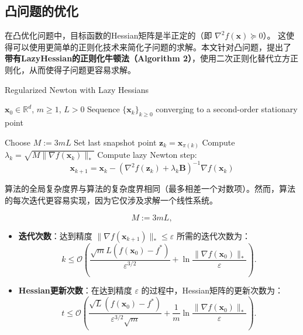 \documentclass[a4paper,twoside,AutoFakeBold]{article}
\theoremstyle{definition}
\begin{document}
\newpage

\subsection{凸问题的优化}\label{sec:4}
在凸优化问题中，目标函数的Hessian矩阵是半正定的（即 \(\nabla^{2}f(\mathbf{x}) \succeq 0\)）。
这使得可以使用更简单的正则化技术来简化子问题的求解。本文针对凸问题，提出了
\textbf{带有LazyHessian的正则化牛顿法（Algorithm 2）}，使用二次正则化替代立方正则化，从而使得子问题更容易求解。

\begin{algorithm}
\caption{Regularized Newton with Lazy Hessians}\label{alg:2}
\begin{algorithmic}[2]
\REQUIRE $\mathbf{x}_{0} \in \mathbb{R}^{d}$, $m \geq 1$, $L > 0$
\ENSURE Sequence $\{\mathbf{x}_{k}\}_{k \geq 0}$ converging to a second-order stationary point

\STATE Choose $M := 3mL$ 
	\STATE Set last snapshot point $\mathbf{z}_{k} = \mathbf{x}_{\pi(k)}$ 
	\STATE Compute $\lambda_{k} = \sqrt{M \|\nabla f(\mathbf{x}_{k})\|_{*}}$ 
	\STATE Compute lazy Newton step:
	\[
	\mathbf{x}_{k+1} = \mathbf{x}_{k} - \left( \nabla^{2}f(\mathbf{z}_{k}) + \lambda_{k} \mathbf{B} \right)^{-1} \nabla f(\mathbf{x}_{k})
	\]
\ENDFOR
\end{algorithmic}
\end{algorithm}
算法的全局复杂度界与算法的复杂度界相同（最多相差一个对数项）。然而，算法的每次迭代更容易实现，因为它仅涉及求解一个线性系统。
\begin{mdframed}
	\begin{equation}\label{20}
		M := 3mL , \tag{20}
	\end{equation}
\end{mdframed}
\begin{itemize}
    \item \textbf{迭代次数}：达到精度 \(\|\nabla f(\mathbf{x}_{k+1})\|_{*} \leq \varepsilon\) 所需的迭代次数为：
    \begin{equation}\label{22}
    k \leq \mathcal{O}\left( \frac{\sqrt{m} L (f(\mathbf{x}_{0}) - f^{*})}{\varepsilon^{3/2}} + \ln \frac{\|\nabla f(\mathbf{x}_{0})\|_{*}}{\varepsilon} \right). \tag{22}
	\end{equation}

    \item \textbf{Hessian更新次数}：在达到精度 \(\varepsilon\) 的过程中，Hessian矩阵的更新次数为：
    \begin{equation}\label{23}
    t \leq \mathcal{O}\left( \frac{\sqrt{L} (f(\mathbf{x}_{0}) - f^{*})}{\varepsilon^{3/2} \sqrt{m}} + \frac{1}{m} \ln \frac{\|\nabla f(\mathbf{x}_{0})\|_{*}}{\varepsilon} \right). \tag{23}
    \end{equation}
\end{itemize}
\newpage
\end{document}

